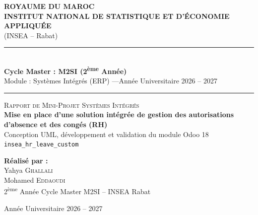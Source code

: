 \documentclass[11pt,a4paper]{article}
\begin{document}
\begin{titlepage}
    \centering
    \vspace*{0.5cm}
    {\large\bfseries\color{inseaBlue} ROYAUME DU MAROC}\\[0.2cm]
    {\Large\bfseries\color{inseaBlue} INSTITUT NATIONAL DE STATISTIQUE ET D'ÉCONOMIE APPLIQUÉE}\\[0.15cm]
    {\normalsize\color{grayText} (INSEA -- Rabat)}\\[0.6cm]
    \rule{\textwidth}{1.2pt}\\[0.3cm]
    {\large\bfseries Cycle Master : M2SI (2\textsuperscript{ème} Année)}\\[0.15cm]
    {\normalsize Module : Systèmes Intégrés (ERP) \quad---\quad Année Universitaire 2026 -- 2027}\\[0.3cm]
    \rule{\textwidth}{1.2pt}

    \vspace{2.2cm}
    \begin{tcolorbox}[colback=inseaLight, colframe=inseaBlue, boxrule=1.5pt, arc=6pt,
                      top=18pt, bottom=18pt, left=14pt, right=14pt]
        \centering
        {\small\scshape\color{inseaTeal} Rapport de Mini-Projet Systèmes Intégrés}\\[0.4cm]
        {\LARGE\bfseries\color{inseaBlue} Mise en place d'une solution intégrée de gestion des autorisations d'absence et des congés (RH)}\\[0.5cm]
        {\large\color{grayText} Conception UML, développement et validation du module Odoo 18 \texttt{insea\_hr\_leave\_custom}}
    \end{tcolorbox}

    \vspace{2.2cm}
    \begin{center}
        {\large\bfseries\color{inseaBlue} Réalisé par :}\\[0.35cm]
        {\large Yahya \textsc{Ghallali}}\\[0.15cm]
        {\large Mohamed \textsc{Eddaoudi}}\\[0.25cm]
        {\normalsize\color{grayText} 2\textsuperscript{ème} Année Cycle Master M2SI -- INSEA Rabat}
    \end{center}

    \vfill
    {\normalsize\color{grayText} Année Universitaire 2026 -- 2027}
\end{titlepage}
\end{document}
